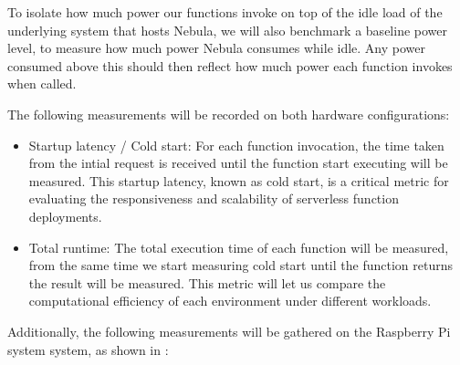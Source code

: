 \documentclass[
  table]{report}
\begin{document}
To isolate how much power our functions invoke on top of the idle load
of the underlying system that hosts Nebula, we will also benchmark a
baseline power level, to measure how much power Nebula consumes while
idle. Any power consumed above this should then reflect how much power
each function invokes when called.

The following measurements will be recorded on both hardware
configurations:

\begin{itemize}
\item
  Startup latency / Cold start: For each function invocation, the time
  taken from the intial request is received until the function start
  executing will be measured. This startup latency, known as cold start,
  is a critical metric for evaluating the responsiveness and scalability
  of serverless function deployments.
\item
  Total runtime: The total execution time of each function will be
  measured, from the same time we start measuring cold start until the
  function returns the result will be measured. This metric will let us
  compare the computational efficiency of each environment under
  different workloads.
\end{itemize}

Additionally, the following measurements will be gathered on the
Raspberry Pi system system, as shown in :
\end{document}
